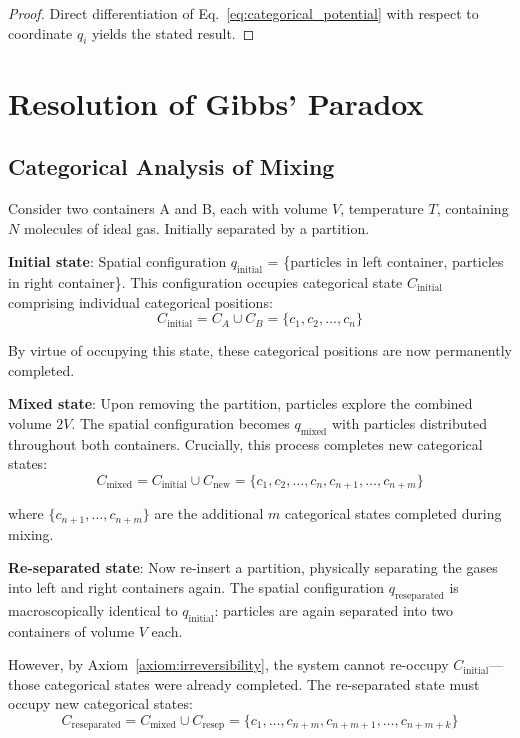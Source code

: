 \documentclass[12pt,a4paper]{article}
\theoremstyle{remark}
\begin{document}
\begin{proof}
Direct differentiation of Eq.~\eqref{eq:categorical_potential} with respect to coordinate $q_i$ yields the stated result.
\end{proof}

\section{Resolution of Gibbs' Paradox}

\subsection{Categorical Analysis of Mixing}

Consider two containers A and B, each with volume $V$, temperature $T$, containing $N$ molecules of ideal gas. Initially separated by a partition.

\textbf{Initial state}: Spatial configuration $q_\text{initial}$ = \{particles in left container, particles in right container\}. This configuration occupies categorical state $C_\text{initial}$ comprising individual categorical positions:
\begin{equation}
C_\text{initial} = C_A \cup C_B = \{c_1, c_2, \ldots, c_n\}
\end{equation}

By virtue of occupying this state, these categorical positions are now permanently completed.

\textbf{Mixed state}: Upon removing the partition, particles explore the combined volume $2V$. The spatial configuration becomes $q_\text{mixed}$ with particles distributed throughout both containers. Crucially, this process completes new categorical states:
\begin{equation}
C_\text{mixed} = C_\text{initial} \cup C_\text{new} = \{c_1, c_2, \ldots, c_n, c_{n+1}, \ldots, c_{n+m}\}
\end{equation}

where $\{c_{n+1}, \ldots, c_{n+m}\}$ are the additional $m$ categorical states completed during mixing.

\textbf{Re-separated state}: Now re-insert a partition, physically separating the gases into left and right containers again. The spatial configuration $q_\text{reseparated}$ is macroscopically identical to $q_\text{initial}$: particles are again separated into two containers of volume $V$ each.

However, by Axiom~\ref{axiom:irreversibility}, the system cannot re-occupy $C_\text{initial}$—those categorical states were already completed. The re-separated state must occupy new categorical states:
\begin{equation}
C_\text{reseparated} = C_\text{mixed} \cup C_\text{resep} = \{c_1, \ldots, c_{n+m}, c_{n+m+1}, \ldots, c_{n+m+k}\}
\end{equation}
\end{document}
